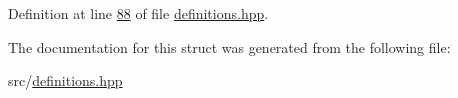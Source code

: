 Definition at line \hyperlink{definitions_8hpp_source_l00088}{88} of file \hyperlink{definitions_8hpp_source}{definitions.\+hpp}.



The documentation for this struct was generated from the following file\+:\begin{DoxyCompactItemize}
\item 
src/\hyperlink{definitions_8hpp}{definitions.\+hpp}\end{DoxyCompactItemize}
